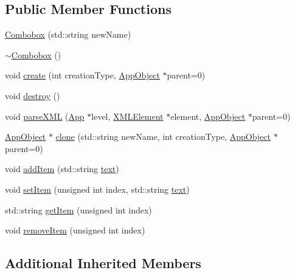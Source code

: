 \subsection*{Public Member Functions}
\begin{DoxyCompactItemize}
\item 
\hyperlink{class_rad_xml_1_1_combobox_a1181039326679d558acd3f249817d51e}{Combobox} (std\-::string new\-Name)
\item 
\hyperlink{class_rad_xml_1_1_combobox_a6d907ba99fb31c0b6ec04697cc195b00}{$\sim$\-Combobox} ()
\item 
void \hyperlink{class_rad_xml_1_1_combobox_a4b8a311ed91833527e8a049d09c667da}{create} (int creation\-Type, \hyperlink{class_rad_xml_1_1_app_object}{App\-Object} $\ast$parent=0)
\item 
void \hyperlink{class_rad_xml_1_1_combobox_a256e54e93bae19780fda7152de0ce7d1}{destroy} ()
\item 
void \hyperlink{class_rad_xml_1_1_combobox_afb6f89853001a2e0e4a50f925411e05d}{parse\-X\-M\-L} (\hyperlink{class_rad_xml_1_1_app}{App} $\ast$level, \hyperlink{class_x_m_l_element}{X\-M\-L\-Element} $\ast$element, \hyperlink{class_rad_xml_1_1_app_object}{App\-Object} $\ast$parent=0)
\item 
\hyperlink{class_rad_xml_1_1_app_object}{App\-Object} $\ast$ \hyperlink{class_rad_xml_1_1_combobox_a9fdf36d33db1f3f279ed7d4d7d423f4e}{clone} (std\-::string new\-Name, int creation\-Type, \hyperlink{class_rad_xml_1_1_app_object}{App\-Object} $\ast$parent=0)
\item 
void \hyperlink{class_rad_xml_1_1_combobox_a148e77b4459c4278963ffd1169cc6fc4}{add\-Item} (std\-::string \hyperlink{class_rad_xml_1_1_app_object_afe1867c9d16057f9e2d82cad5e8bc0cd}{text})
\item 
void \hyperlink{class_rad_xml_1_1_combobox_a30dd852a9a0d3be4eb2c0cce1384d582}{set\-Item} (unsigned int index, std\-::string \hyperlink{class_rad_xml_1_1_app_object_afe1867c9d16057f9e2d82cad5e8bc0cd}{text})
\item 
std\-::string \hyperlink{class_rad_xml_1_1_combobox_afe1cfb90c168c0f4c86b704a6dfd8b95}{get\-Item} (unsigned int index)
\item 
void \hyperlink{class_rad_xml_1_1_combobox_ac5dbcfbf7828d82a69253321ddf85daa}{remove\-Item} (unsigned int index)
\end{DoxyCompactItemize}
\subsection*{Additional Inherited Members}


